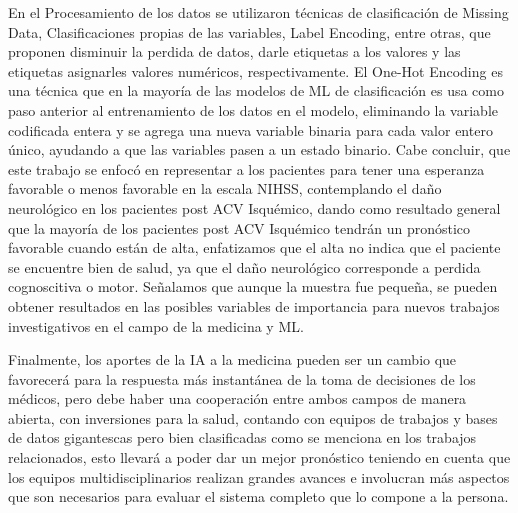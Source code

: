 \par En el Procesamiento de los datos se utilizaron técnicas de clasificación de Missing Data, Clasificaciones propias de las variables, Label Encoding, entre otras, que proponen disminuir la perdida de datos, darle etiquetas a los valores y las etiquetas asignarles valores numéricos, respectivamente.
El One-Hot Encoding es una técnica que en la mayoría de las modelos de ML de clasificación es usa como paso anterior al entrenamiento de los datos en el modelo, eliminando la variable codificada entera y se agrega una nueva variable binaria para cada valor entero único, ayudando a que las variables pasen a un estado binario.
Cabe concluir, que este trabajo se enfocó en representar a los pacientes para tener una esperanza favorable o menos favorable en la escala NIHSS, contemplando el daño neurológico en los pacientes post ACV Isquémico, dando como resultado general que la mayoría de los pacientes post ACV Isquémico tendrán un pronóstico favorable cuando están de alta, enfatizamos que el alta no indica que el paciente se encuentre bien de salud, ya que el daño neurológico corresponde a perdida cognoscitiva o motor. Señalamos que aunque la muestra fue pequeña, se pueden obtener resultados en las posibles variables de importancia para nuevos trabajos investigativos en el campo de la medicina y ML.\\

\par Finalmente, los aportes de la IA a la medicina pueden ser un cambio que favorecerá para la respuesta más instantánea de la toma de decisiones de los médicos, pero debe haber una cooperación entre ambos campos de manera abierta, con inversiones para la salud, contando con equipos de trabajos y bases de datos gigantescas pero bien clasificadas como se menciona en los trabajos relacionados, esto llevará a poder dar un mejor pronóstico teniendo en cuenta que los equipos multidisciplinarios realizan grandes avances e involucran más aspectos que son necesarios para evaluar el sistema completo que lo compone a la persona. 
